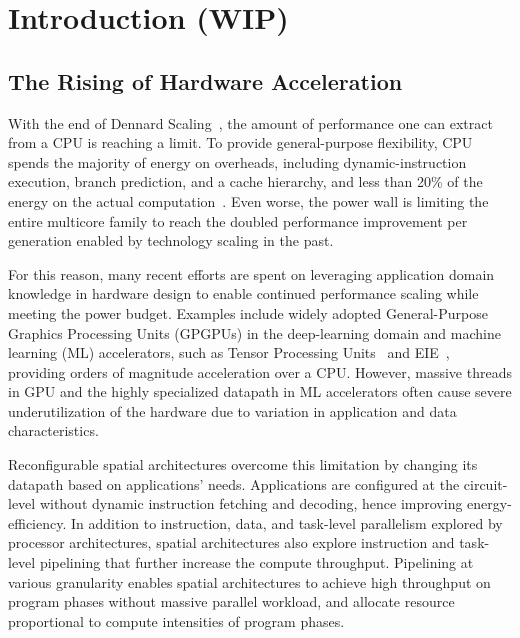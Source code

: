 \chapter{Introduction (WIP)}

\section{The Rising of Hardware Acceleration}

With the end of Dennard Scaling~\cite{dennard}, the amount of performance one can extract from a CPU is reaching a limit.
To provide general-purpose flexibility, CPU spends the majority of energy on overheads, including dynamic-instruction execution, branch prediction, and a cache hierarchy, and less than 20\% of the energy on the actual computation~\cite{mark}.
Even worse, the power wall is limiting the entire multicore family
to reach the doubled performance improvement per generation enabled by technology scaling in the past\cite{multicorescale}.

For this reason, many recent efforts are spent on leveraging application domain knowledge in hardware design to enable 
continued performance scaling while meeting the power budget\cite{turinglecture}.
Examples include widely adopted General-Purpose Graphics Processing Units (GPGPUs) in the deep-learning domain and machine learning (ML) accelerators, such as Tensor Processing Units~\cite{tpu} and EIE~\cite{eie}, providing orders of magnitude acceleration over a CPU.
However, massive threads in GPU and the highly specialized datapath in ML accelerators often cause severe
underutilization of the hardware due to variation in application and data characteristics\cite{tz_rnn}.

Reconfigurable spatial architectures overcome this limitation by changing its datapath based on applications' needs.
Applications are configured at the circuit-level without dynamic instruction fetching and decoding, hence improving energy-efficiency.
In addition to instruction, data, and task-level parallelism explored by processor architectures, spatial architectures also explore instruction and task-level
pipelining that further increase the compute throughput.
Pipelining at various granularity enables spatial architectures to achieve high throughput on program phases without massive parallel workload, and allocate resource proportional to compute intensities of program phases.


